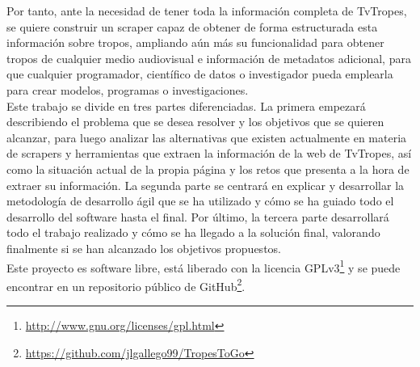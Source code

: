 Por tanto, ante la necesidad de tener toda la información completa de TvTropes,
se quiere construir un scraper capaz de obtener de forma estructurada esta
información sobre tropos, ampliando aún más su funcionalidad para obtener tropos
de cualquier medio audiovisual e información de metadatos adicional, para que
cualquier programador, científico de datos o investigador pueda emplearla para
crear modelos, programas o investigaciones.\\

Este trabajo se divide en tres partes diferenciadas. La primera empezará
describiendo el problema que se desea resolver y los objetivos que se quieren
alcanzar, para luego analizar las alternativas que existen actualmente en
materia de scrapers y herramientas que extraen la información de la web de
TvTropes, así como la situación actual de la propia página y los retos que
presenta a la hora de extraer su información. La segunda parte se centrará en
explicar y desarrollar la metodología de desarrollo ágil que se ha utilizado y
cómo se ha guiado todo el desarrollo del software hasta el final. Por último, la
tercera parte desarrollará todo el trabajo realizado y cómo se ha llegado a la
solución final, valorando finalmente si se han alcanzado los objetivos
propuestos.\\

Este proyecto es software libre, está liberado con la licencia
GPLv3\footnote{\url{http://www.gnu.org/licenses/gpl.html}} y se puede encontrar
en un repositorio público de
GitHub\footnote{\url{https://github.com/jlgallego99/TropesToGo}}.
